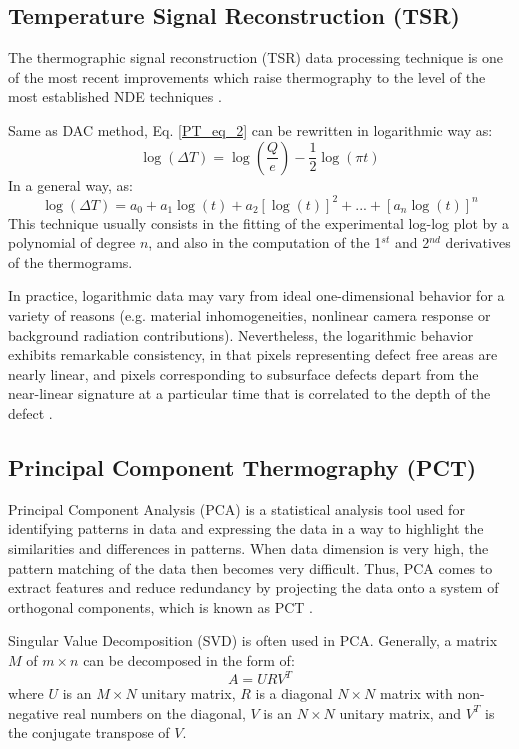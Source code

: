 \subsection{Temperature Signal Reconstruction (TSR)}
The thermographic signal reconstruction (TSR) data processing technique is one of the most recent improvements which raise thermography to the level of the most established NDE techniques \citep{shepard2003reconstruction, Balageas2015}.

Same as DAC method, Eq. \ref{PT_eq_2} can be rewritten  in logarithmic way as:
\begin{equation}
\log (\Delta T) = \log (\frac{Q}{e}) - \frac{1}{2}\log (\pi t)
\end{equation}
In a general way, as: %
\begin{equation}
\log (\Delta T) = a_0 + a_1\log (t) + a_2[\log (t)]^2 +...+ [a_n\log(t)]^n
\end{equation}
This technique usually consists in the fitting of the experimental log-log plot by a polynomial of degree $n$, and also in the computation of the 1$^{st}$ and 2$^{nd}$ derivatives of the thermograms.

In practice, logarithmic data may vary from ideal one-dimensional behavior for a variety of reasons (e.g. material inhomogeneities, nonlinear camera response or background radiation contributions). Nevertheless, the logarithmic behavior exhibits remarkable consistency, in that pixels representing defect free areas are nearly linear, and pixels corresponding to subsurface defects depart from the near-linear signature at a particular time that is correlated to the depth of the defect \citep{Shepard2002,Shepard2003}.


\subsection{Principal Component Thermography (PCT)}
Principal Component Analysis (PCA) is a statistical analysis tool used for identifying patterns in data and expressing the data in a way to highlight the similarities and differences in patterns. When data dimension is very high, the pattern matching of the data then becomes very difficult. Thus, PCA comes to extract features and reduce redundancy by projecting the data onto a system of orthogonal components, which is known as PCT \citep{Rajic2002,Rajic2002a}. 

Singular Value Decomposition (SVD) is often used in PCA. Generally, a matrix $M$ of $m\times n$ can be decomposed in the form of:
\begin{equation}
A = U R V^T
\end{equation}
where $U$ is an $M\times N$ unitary matrix, $R$ is a diagonal $N \times N$ matrix with non-negative real numbers on the diagonal, $V$ is an $N\times N$ unitary matrix, and $V^T$ is the conjugate transpose of $V$.


